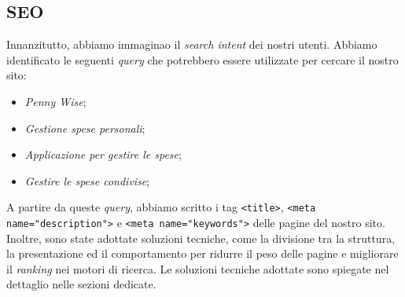 \subsection{SEO}

Innanzitutto, abbiamo immaginao il \textit{search intent} dei nostri utenti. 
Abbiamo identificato le seguenti \textit{query} che potrebbero essere 
utilizzate per cercare il nostro sito:
\begin{itemize}
	\item \textit{Penny Wise};
	\item \textit{Gestione spese personali};
	\item \textit{Applicazione per gestire le spese};
	\item \textit{Gestire le spese condivise};
\end{itemize}

A partire da queste \textit{query}, abbiamo scritto i tag \texttt{<title>},
\texttt{<meta name="description">} e \texttt{<meta name="keywords">} delle
pagine del nostro sito. Inoltre, sono state adottate soluzioni tecniche, come la
divisione tra la struttura, la presentazione ed il comportamento per ridurre il
peso delle pagine e migliorare il \textit{ranking} nei motori di ricerca. Le
soluzioni tecniche adottate sono spiegate nel dettaglio nelle sezioni dedicate.
